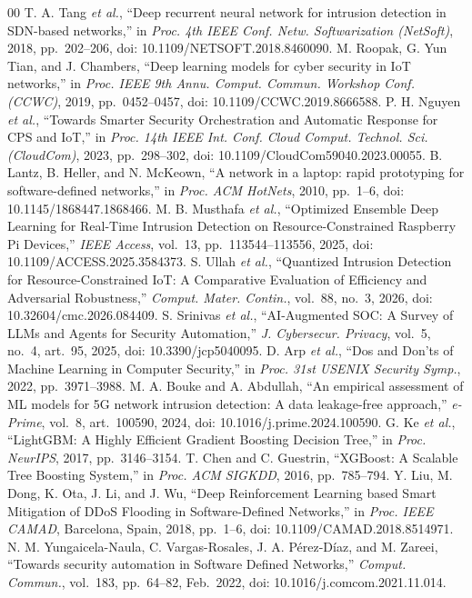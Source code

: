 \documentclass[conference,a4paper]{IEEEtran}
\begin{document}
\begin{thebibliography}{00}
 T. A. Tang \textit{et al.}, ``Deep recurrent neural network for intrusion detection in SDN-based networks,'' in \textit{Proc. 4th IEEE Conf. Netw. Softwarization (NetSoft)}, 2018, pp.~202--206, doi: 10.1109/NETSOFT.2018.8460090.
 M. Roopak, G. Yun Tian, and J. Chambers, ``Deep learning models for cyber security in IoT networks,'' in \textit{Proc. IEEE 9th Annu. Comput. Commun. Workshop Conf. (CCWC)}, 2019, pp.~0452--0457, doi: 10.1109/CCWC.2019.8666588.
 P. H. Nguyen \textit{et al.}, ``Towards Smarter Security Orchestration and Automatic Response for CPS and IoT,'' in \textit{Proc. 14th IEEE Int. Conf. Cloud Comput. Technol. Sci. (CloudCom)}, 2023, pp.~298--302, doi: 10.1109/CloudCom59040.2023.00055.
 B. Lantz, B. Heller, and N. McKeown, ``A network in a laptop: rapid prototyping for software-defined networks,'' in \textit{Proc. ACM HotNets}, 2010, pp.~1--6, doi: 10.1145/1868447.1868466.
 M. B. Musthafa \textit{et al.}, ``Optimized Ensemble Deep Learning for Real-Time Intrusion Detection on Resource-Constrained Raspberry Pi Devices,'' \textit{IEEE Access}, vol.~13, pp.~113544--113556, 2025, doi: 10.1109/ACCESS.2025.3584373.
 S. Ullah \textit{et al.}, ``Quantized Intrusion Detection for Resource-Constrained IoT: A Comparative Evaluation of Efficiency and Adversarial Robustness,'' \textit{Comput. Mater. Contin.}, vol.~88, no.~3, 2026, doi: 10.32604/cmc.2026.084409.
 S. Srinivas \textit{et al.}, ``AI-Augmented SOC: A Survey of LLMs and Agents for Security Automation,'' \textit{J. Cybersecur. Privacy}, vol.~5, no.~4, art.~95, 2025, doi: 10.3390/jcp5040095.
 D. Arp \textit{et al.}, ``Dos and Don'ts of Machine Learning in Computer Security,'' in \textit{Proc. 31st USENIX Security Symp.}, 2022, pp.~3971--3988.
 M. A. Bouke and A. Abdullah, ``An empirical assessment of ML models for 5G network intrusion detection: A data leakage-free approach,'' \textit{e-Prime}, vol.~8, art.~100590, 2024, doi: 10.1016/j.prime.2024.100590.
 G. Ke \textit{et al.}, ``LightGBM: A Highly Efficient Gradient Boosting Decision Tree,'' in \textit{Proc. NeurIPS}, 2017, pp.~3146--3154.
 T. Chen and C. Guestrin, ``XGBoost: A Scalable Tree Boosting System,'' in \textit{Proc. ACM SIGKDD}, 2016, pp.~785--794.
 Y. Liu, M. Dong, K. Ota, J. Li, and J. Wu, ``Deep Reinforcement Learning based Smart Mitigation of DDoS Flooding in Software-Defined Networks,'' in \textit{Proc. IEEE CAMAD}, Barcelona, Spain, 2018, pp.~1--6, doi: 10.1109/CAMAD.2018.8514971.
 N. M. Yungaicela-Naula, C. Vargas-Rosales, J. A. P\'erez-D\'iaz, and M. Zareei, ``Towards security automation in Software Defined Networks,'' \textit{Comput. Commun.}, vol.~183, pp.~64--82, Feb.~2022, doi: 10.1016/j.comcom.2021.11.014.
\end{thebibliography}
\end{document}
